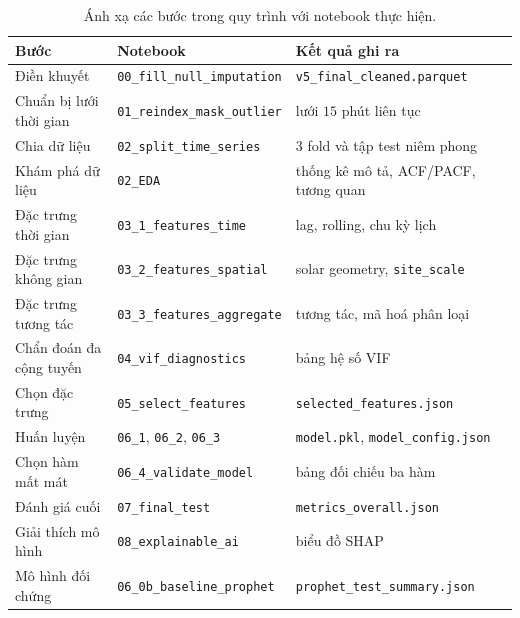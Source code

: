 \begin{table}[htbp]
\centering

\footnotesize
\renewcommand{\baselinestretch}{1.0}\selectfont
\begin{tabular}{@{}p{3.4cm} p{4.6cm} p{5.4cm}@{}}
\toprule
\textbf{Bước} & \textbf{Notebook} & \textbf{Kết quả ghi ra} \\
\midrule
Điền khuyết & \texttt{00\_fill\_null\_imputation} & \texttt{v5\_final\_cleaned.parquet} \\
Chuẩn bị lưới thời gian & \texttt{01\_reindex\_mask\_outlier} & lưới $15$ phút liên tục \\
Chia dữ liệu & \texttt{02\_split\_time\_series} & $3$ fold và tập test niêm phong \\
Khám phá dữ liệu & \texttt{02\_EDA} & thống kê mô tả, ACF/PACF, tương quan \\
Đặc trưng thời gian & \texttt{03\_1\_features\_time} & lag, rolling, chu kỳ lịch \\
Đặc trưng không gian & \texttt{03\_2\_features\_spatial} & solar geometry, \texttt{site\_scale} \\
Đặc trưng tương tác & \texttt{03\_3\_features\_aggregate} & tương tác, mã hoá phân loại \\
Chẩn đoán đa cộng tuyến & \texttt{04\_vif\_diagnostics} & bảng hệ số VIF \\
Chọn đặc trưng & \texttt{05\_select\_features} & \texttt{selected\_features.json} \\
Huấn luyện & \texttt{06\_1}, \texttt{06\_2}, \texttt{06\_3} & \texttt{model.pkl}, \texttt{model\_config.json} \\
Chọn hàm mất mát & \texttt{06\_4\_validate\_model} & bảng đối chiếu ba hàm \\
Đánh giá cuối & \texttt{07\_final\_test} & \texttt{metrics\_overall.json} \\
Giải thích mô hình & \texttt{08\_explainable\_ai} & biểu đồ SHAP \\
Mô hình đối chứng & \texttt{06\_0b\_baseline\_prophet} & \texttt{prophet\_test\_summary.json} \\
\bottomrule
\end{tabular}
\caption{Ánh xạ các bước trong quy trình với notebook thực hiện.}
\label{tab:notebook_pipeline}
\end{table}

